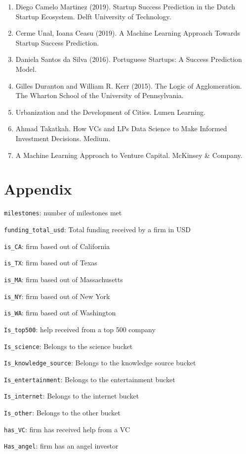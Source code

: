 \documentclass[
]{article}
\begin{document}
\begin{enumerate}
\def\labelenumi{\arabic{enumi}.}
\item
  Diego Camelo Martinez (2019). Startup Success Prediction in the Dutch
  Startup Ecosystem. Delft University of Technology.
\item
  Cerme Unal, Ioana Ceasu (2019). A Machine Learning Approach Towards
  Startup Success Prediction.
\item
  Daniela Santos da Silva (2016). Portuguese Startups: A Success
  Prediction Model.
\item
  Gilles Duranton and William R. Kerr (2015). The Logic of
  Agglomeration. The Wharton School of the University of Pennsylvania.
\item
  Urbanization and the Development of Cities. Lumen Learning.
\item
  Ahmad Takatkah. How VCs and LPs Data Science to Make Informed
  Investment Decisions. Medium.
\item
  A Machine Learning Approach to Venture Capital. McKinsey \& Company.
\end{enumerate}

\hypertarget{appendix}{%
\section{Appendix}\label{appendix}}

\texttt{milestones}: number of milestones met

\texttt{funding\_total\_usd}: Total funding received by a firm in USD

\texttt{is\_CA}: firm based out of California

\texttt{is\_TX}: firm based out of Texas

\texttt{is\_MA}: firm based out of Massachusetts

\texttt{is\_NY}: firm based out of New York

\texttt{is\_WA}: firm based out of Washington

\texttt{Is\_top500}: help received from a top 500 company

\texttt{Is\_science}: Belongs to the science bucket

\texttt{Is\_knowledge\_source}: Belongs to the knowledge source bucket

\texttt{Is\_entertainment}: Belongs to the entertainment bucket

\texttt{Is\_internet}: Belongs to the internet bucket

\texttt{Is\_other}: Belongs to the other bucket

\texttt{has\_VC}: firm has received help from a VC

\texttt{Has\_angel}: firm has an angel investor
\end{document}
